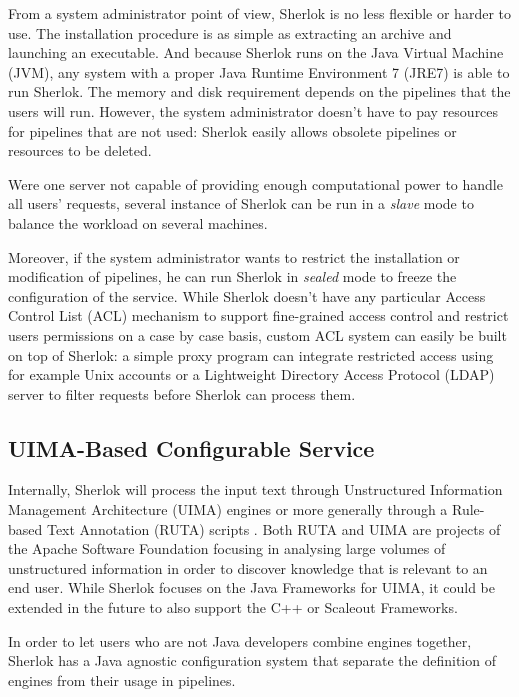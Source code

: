 \documentclass{article}
\begin{document}
From a system administrator point of view, Sherlok is no less flexible or harder to use. The
installation procedure is as simple as extracting an archive and launching an executable. And
because Sherlok runs on the Java Virtual Machine (JVM), any system with a proper Java Runtime
Environment 7 (JRE7) is able to run Sherlok. The memory and disk requirement depends on the
pipelines that the users will run. However, the system administrator doesn't have to pay resources
for pipelines that are not used: Sherlok easily allows obsolete pipelines or resources to be
deleted.

Were one server not capable of providing enough computational power to handle all users' requests,
several instance of Sherlok can be run in a \emph{slave} mode to balance the workload on several
machines.

Moreover, if the system administrator wants to restrict the installation or modification of
pipelines, he can run Sherlok in \emph{sealed} mode to freeze the configuration of the service.
While Sherlok doesn't have any particular Access Control List (ACL) mechanism to support
fine-grained access control and restrict users permissions on a case by case basis, custom ACL
system can easily be built on top of Sherlok: a simple proxy program can integrate restricted access
using for example Unix accounts or a Lightweight Directory Access Protocol (LDAP) server to filter
requests before Sherlok can process them.

\subsection{UIMA-Based Configurable Service}

Internally, Sherlok will process the input text through Unstructured Information Management
Architecture (UIMA) \cite{uima} engines or more generally through a Rule-based Text Annotation
(RUTA) scripts \cite{ruta}. Both RUTA and UIMA are projects of the Apache Software Foundation
\cite{apachefundation} focusing in analysing large volumes of unstructured information in order to
discover knowledge that is relevant to an end user. While Sherlok focuses on the Java Frameworks for
UIMA, it could be extended in the future to also support the C++ or Scaleout Frameworks.

In order to let users who are not Java developers combine engines together, Sherlok has a Java
agnostic configuration system that separate the definition of engines from their usage in pipelines.
\end{document}
